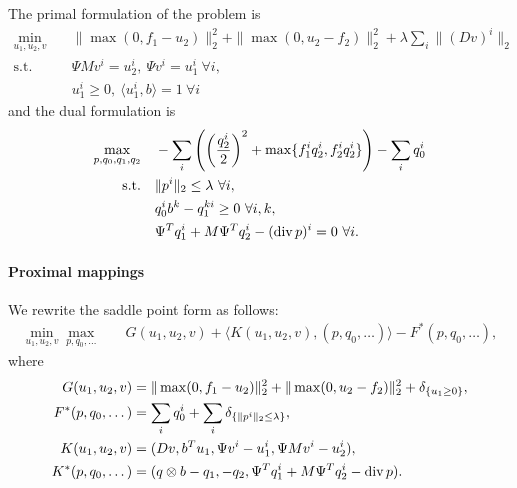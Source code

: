 The primal formulation of the problem is
\begin{align*}
    \min_{u_1,u_2,v} \quad
        & \|\max(0, f_1 - u_2)\|_2^2 + \|\max(0, u_2 - f_2)\|_2^2
            + \lambda \sum_{i} \| (D v)^{i} \|_{2} \\
    \text{s.t.}\quad 
        & \Psi M v^i = u_2^i, ~\Psi v^i = u_1^i ~\forall i, \\
        & u_1^i \geq 0, ~\langle u_1^i, b \rangle = 1 ~\forall i
\end{align*}
and the dual formulation is
\begin{align*}
    \max_{p,q_0,q_1,q_2} \quad
        & -\sum_i \left(
                \left(\frac{q_2^i}{2}\right)^2 + \max\{f_1^i q_2^i,f_2^i q_2^i\}
        \right) - \sum_i q_0^i  \\
    \text{s.t.}\quad 
        & \|p^{i}\|_{2} \leq \lambda ~\forall i, \\
        & q_0^i b^k - q_1^{ki} \geq 0 ~\forall i, k, \\
        & \Psi^T q_1^i + M \Psi^T q_2^i - (\operatorname{div} p)^i = 0 ~\forall i.
\end{align*}

\paragraph{Proximal mappings}

We rewrite the saddle point form as follows:
\begin{align*}
    \min_{u_1,u_2,v} \max_{p,q_0,\dots} \quad
        & G(u_1,u_2,v) + \langle K(u_1,u_2,v), (p,q_0,\dots) \rangle - F^*(p,q_0,\dots),
\end{align*}
where
\begin{align*}
    G(u_1,u_2,v) &= \|\max(0, f_1 - u_2)\|_2^2 + \|\max(0, u_2 - f_2)\|_2^2
        + \delta_{\{u_1 \geq 0\}}, \\
    F^*(p,q_0,\dots) &= \sum_{i} q_0^i 
        + \sum_{i} \delta_{\{\|p^{i}\|_{2} \leq \lambda\}}, \\
    K(u_1,u_2,v) &= (
        Dv,
        b^T u_1,
        \Psi v^i - u_1^i,
        \Psi M v^i - u_2^i
    ), \\
    K^*(p,q_0,\dots) &= (
        q \otimes b - q_1,
        -q_2,
        \Psi^T q_1^i + M \Psi^T q_2^i - \operatorname{div}{p}
    ).
\end{align*}

